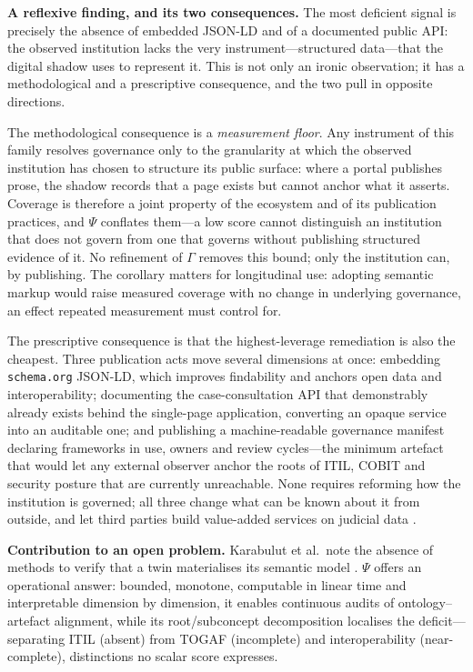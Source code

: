 \documentclass[engproc,proceedingpaper,submit,moreauthors]{Definitions/mdpi}
\begin{document}
\textbf{A reflexive finding, and its two consequences.} The most deficient signal is precisely the absence of embedded JSON-LD and of a documented public API: the observed institution lacks the very instrument---structured data---that the digital shadow uses to represent it. This is not only an ironic observation; it has a methodological and a prescriptive consequence, and the two pull in opposite directions.

The methodological consequence is a \emph{measurement floor}. Any instrument of this family resolves governance only to the granularity at which the observed institution has chosen to structure its public surface: where a portal publishes prose, the shadow records that a page exists but cannot anchor what it asserts. Coverage is therefore a joint property of the ecosystem and of its publication practices, and $\Psi$ conflates them---a low score cannot distinguish an institution that does not govern from one that governs without publishing structured evidence of it. No refinement of $\Gamma$ removes this bound; only the institution can, by publishing. The corollary matters for longitudinal use: adopting semantic markup would raise measured coverage with no change in underlying governance, an effect repeated measurement must control for.

The prescriptive consequence is that the highest-leverage remediation is also the cheapest. Three publication acts move several dimensions at once: embedding \texttt{schema.org} JSON-LD, which improves findability \cite{Guha2016} and anchors open data and interoperability; documenting the case-consultation API that demonstrably already exists behind the single-page application, converting an opaque service into an auditable one; and publishing a machine-readable governance manifest declaring frameworks in use, owners and review cycles---the minimum artefact that would let any external observer anchor the roots of ITIL, COBIT and security posture that are currently unreachable. None requires reforming how the institution is governed; all three change what can be known about it from outside, and let third parties build value-added services on judicial data \cite{Attard2015,Wilkinson2016}.

\textbf{Contribution to an open problem.} Karabulut et al.\ note the absence of methods to verify that a twin materialises its semantic model \cite{Karabulut2024}. $\Psi$ offers an operational answer: bounded, monotone, computable in linear time and interpretable dimension by dimension, it enables continuous audits of ontology--artefact alignment, while its root/subconcept decomposition localises the deficit---separating ITIL (absent) from TOGAF (incomplete) and interoperability (near-complete), distinctions no scalar score expresses. %
\end{document}
